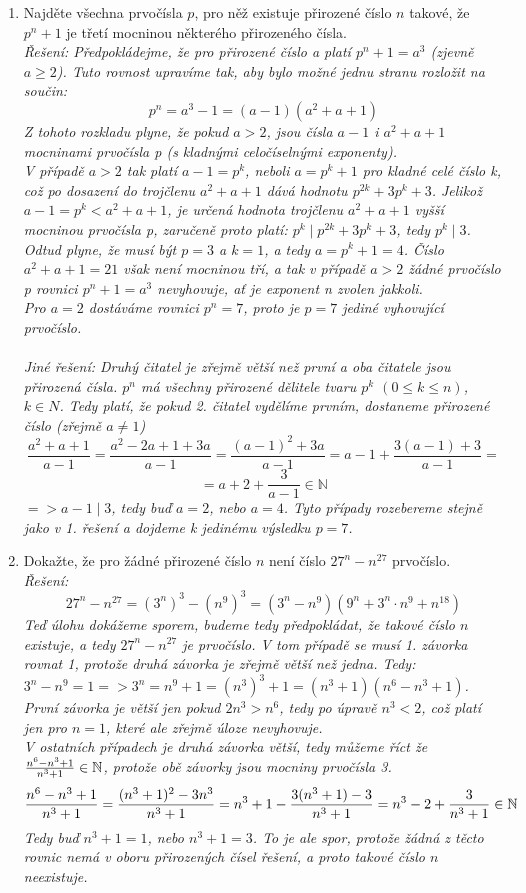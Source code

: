 \documentclass[12pt,a4paper]{report}
\begin{document}
\begin{enumerate}
	\item Najděte všechna prvočísla $p$, pro něž existuje přirozené číslo $n$ takové, že $p^n + 1$ je třetí mocninou některého přirozeného čísla. 
	\\ \textit{Řešení: Předpokládejme, že pro přirozené číslo a platí $p^n + 1 = a^3$ (zjevně $a \geq 2$). Tuto rovnost upravíme tak, aby bylo možné jednu stranu rozložit na součin: $$p^n=a^3-1=(a-1)(a^2+a+1)$$ Z tohoto rozkladu plyne, že pokud $a > 2$, jsou čísla $a - 1$ i $a^2 + a + 1$ mocninami prvočísla p (s kladnými celočíselnými exponenty). \\V případě $a > 2$ tak platí $a-1 = p^k$, neboli $a = p^k +1$ pro kladné celé číslo k, což po dosazení do trojčlenu $a^2+a+1$ dává hodnotu $p^{2k}+3p^k+3$. Jelikož $a-1 = p^k < a^2+a+1$,
		je určená hodnota trojčlenu $a^2 + a + 1$ vyšší mocninou prvočísla p, zaručeně proto platí: $p^k \mid p^{2k}+3p^k+3$, tedy $p^k \mid 3$. Odtud plyne, že musí být $p = 3$ a $k = 1$, a tedy $a = p^k + 1 = 4$. Číslo $a^2 +a+ 1 = 21$ však není mocninou tří, a tak v případě $a > 2$ žádné prvočíslo p rovnici $p^n + 1 = a^3$ nevyhovuje, ať je exponent n zvolen jakkoli.
		\\Pro $a = 2$ dostáváme rovnici $p^n = 7$, proto je $p = 7$ jediné vyhovující prvočíslo.}
		\\\\ \textit{Jiné řešení: Druhý čitatel je zřejmě větší než první a oba čitatele jsou přirozená čísla. $p^n$ má všechny přirozené dělitele tvaru $p^k$ $(0 \leq k \leq n)$, $k \in N$. Tedy platí, že pokud 2. čitatel vydělíme prvním, dostaneme přirozené číslo (zřejmě $a\neq 1$)$$\frac{a^2 +a+ 1}{a-1}=\frac{a^2 -2a+ 1+3a}{a-1}=\frac{(a-1)^2+3a}{a-1}=a-1+\frac{3(a-1)+3}{a-1}=$$ $$=a+2+\frac{3}{a-1} \in \mathbb{N}$$  $ => a-1 \mid 3$, tedy buď $a=2$, nebo $a=4$. Tyto případy rozebereme stejně jako v 1. řešení a dojdeme k jedinému výsledku $p = 7$.}
		\item Dokažte, že pro žádné přirozené číslo $n$ není číslo $27^n - n^{27}$ prvočíslo.
		\\ \textit{Řešení:$$27^n - n^{27}=\left(3^n\right)^3 - \left(n^9\right)^3=\left(3^n-n^9\right)\left(9^n+3^n \cdot n^9+n^{18}\right)$$ Teď úlohu dokážeme sporem, budeme tedy předpokládat, že takové číslo $n$ existuje, a tedy $27^n - n^{27}$ je prvočíslo. V tom případě se musí 1. závorka rovnat 1, protože druhá závorka je zřejmě větší než jedna. Tedy: $3^n-n^9=1 => 3^n=n^9+1=\left(n^3\right)^3+1=\left(n^3+1\right)\left(n^6-n^3+1\right)$.\\První závorka je větší jen pokud $2n^3>n^6$, tedy po úpravě $n^3<2$, což platí jen pro $n=1$, které ale zřejmě úloze nevyhovuje.
		\\V ostatních případech je druhá závorka větší, tedy můžeme říct že ${n^6-n^3+1 \over n^3+1}\in \mathbb{N}$, protože obě závorky jsou mocniny prvočísla 3. $${n^6-n^3+1 \over n^3+1}=\frac{(n^3+1)^2-3n^3 }{n^3+1}=n^3+1-\frac{3(n^3+1)-3 }{n^3+1}=n^3-2+\frac{3}{n^3+1}\in \mathbb{N}$$ Tedy buď $n^3+1=1$, nebo $n^3+1=3$. To je ale spor, protože žádná z těcto rovnic nemá v oboru přirozených čísel řešení, a proto takové číslo $n$ neexistuje.
	}	
	
\end{enumerate}		
\end{document}
